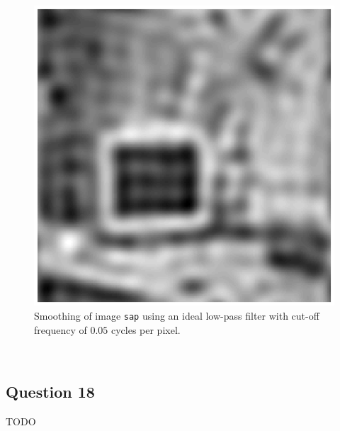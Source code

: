 \begin{minipage}{\linewidth}
\begin{minipage}{0.4\linewidth}
\begin{figure}[H]
      \includegraphics[scale=0.5]{./images/Q17/ideal/sap_005.eps}
      \caption{Smoothing of image \texttt{sap} using an ideal low-pass filter with cut-off frequency of $0.05$ cycles per pixel.}
      \label{fig:Q17_ideal_sap_005}
    \end{figure}
  \end{minipage}
\end{minipage}
\\


\subsection{Question 18}

TODO
